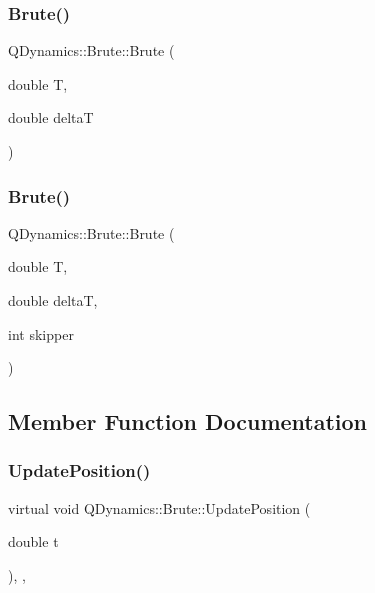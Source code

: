 \subsubsection{\texorpdfstring{Brute()}{Brute()}\hspace{0.1cm}{\footnotesize\ttfamily [1/2]}}
{\footnotesize\ttfamily Q\+Dynamics\+::\+Brute\+::\+Brute (\begin{DoxyParamCaption}\item[{double}]{T,  }\item[{double}]{deltaT }\end{DoxyParamCaption})\hspace{0.3cm}{\ttfamily [inline]}}

\mbox{\label{classQDynamics_1_1Brute_a5f04abe903e88405c24fb5695db6357f}} 
\subsubsection{\texorpdfstring{Brute()}{Brute()}\hspace{0.1cm}{\footnotesize\ttfamily [2/2]}}
{\footnotesize\ttfamily Q\+Dynamics\+::\+Brute\+::\+Brute (\begin{DoxyParamCaption}\item[{double}]{T,  }\item[{double}]{deltaT,  }\item[{int}]{skipper }\end{DoxyParamCaption})\hspace{0.3cm}{\ttfamily [inline]}}



\subsection{Member Function Documentation}
\mbox{\label{classQDynamics_1_1Brute_ac5d4bbe0e34a9f6836f71f40ae8a9eb4}} 
\subsubsection{\texorpdfstring{Update\+Position()}{UpdatePosition()}}
{\footnotesize\ttfamily virtual void Q\+Dynamics\+::\+Brute\+::\+Update\+Position (\begin{DoxyParamCaption}\item[{double}]{t }\end{DoxyParamCaption})\hspace{0.3cm}{\ttfamily [inline]}, {\ttfamily [private]}, {\ttfamily [virtual]}}



